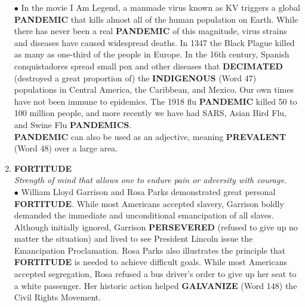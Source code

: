 \documentclass{book}
\begin{document}
\begin{enumerate}
 $\bullet$ In the movie I Am Legend, a manmade virus known as KV triggers a global \textbf{PANDEMIC} that kills almost all of the human population on Earth. While there has never been a real \textbf{PANDEMIC} of this magnitude, virus strains and diseases have caused widespread deaths. In 1347 the Black Plague killed as many as one-third of the people in Europe. In the 16th century, Spanish conquistadores spread small pox and other diseases that \textbf{DECIMATED} (destroyed a great proportion of) the \textbf{INDIGENOUS} (Word 47) populations in Central America, the Caribbean, and Mexico. Our own times have not been immune to epidemics. The 1918 flu \textbf{PANDEMIC} killed 50 to 100 million people, and more recently we have had SARS, Asian Bird Flu, and Swine Flu \textbf{PANDEMICS}.\\ \textbf{PANDEMIC} can also be used as an adjective, meaning \textbf{PREVALENT} (Word 48) over a large area.
\item \textbf{FORTITUDE}\\  \textit{Strength of mind that allows one to endure pain or adversity with courage}.\\ 

$\bullet$ William Lloyd Garrison and Rosa Parks demonstrated great personal \textbf{FORTITUDE}. While most Americans accepted slavery, Garrison boldly demanded the immediate and unconditional emancipation of all slaves. Although initially ignored, Garrison \textbf{PERSEVERED} (refused to give up no matter the situation) and lived to see President Lincoln issue the Emancipation Proclamation. Rosa Parks also illustrates the principle that \textbf{FORTITUDE} is needed to achieve difficult goals. While most Americans accepted segregation, Rosa refused a bus driver's order to give up her seat to a white passenger. Her historic action helped \textbf{GALVANIZE} (Word 148) the Civil Rights Movement.
\end{enumerate}
\end{document}
